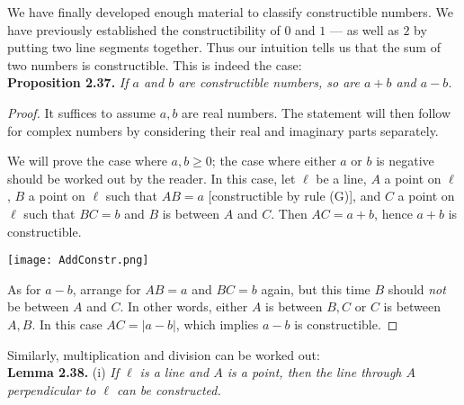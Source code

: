 \documentclass[leqno]{book}
\begin{document}
\noindent We have finally developed enough material to classify constructible numbers.  We have previously established the constructibility of $0$ and $1$ \---- as well as $2$ by putting two line segments together.  Thus our intuition tells us that the sum of two numbers is constructible.  This is indeed the case:\\

\noindent\textbf{Proposition 2.37.} \emph{If $a$ and $b$ are constructible numbers, so are $a+b$ and $a-b$.}
\begin{proof}
It suffices to assume $a,b$ are real numbers.  The statement will then follow for complex numbers by considering their real and imaginary parts separately.

We will prove the case where $a,b\geqslant 0$; the case where either $a$ or $b$ is negative should be worked out by the reader.  In this case, let $\ell$ be a line, $A$ a point on $\ell$, $B$ a point on $\ell$ such that $AB=a$ [constructible by rule (G)], and $C$ a point on $\ell$ such that $BC=b$ and $B$ is between $A$ and $C$.  Then $AC=a+b$, hence $a+b$ is constructible.
\begin{center}\texttt{[image: AddConstr.png]}\end{center}
As for $a-b$, arrange for $AB=a$ and $BC=b$ again, but this time $B$ should \emph{not} be between $A$ and $C$.  In other words, either $A$ is between $B,C$ or $C$ is between $A,B$.  In this case $AC=|a-b|$, which implies $a-b$ is constructible.
\end{proof}
\noindent Similarly, multiplication and division can be worked out:\\

\noindent\textbf{Lemma 2.38.} (i) \emph{If $\ell$ is a line and $A$ is a point, then the line through $A$ perpendicular to $\ell$ can be constructed.}
\end{document}
